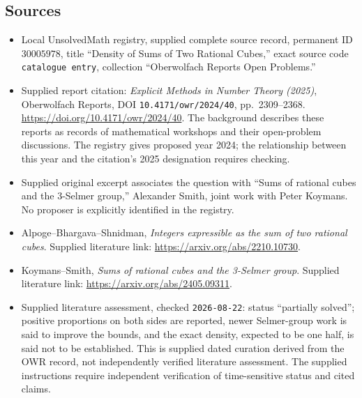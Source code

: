 \documentclass[11pt]{article}
\begin{document}
\subsection{Sources}
\begin{itemize}
\item Local UnsolvedMath registry, supplied complete source record, permanent ID \(30005978\), title ``Density of Sums of Two Rational Cubes,'' exact source code \texttt{catalogue entry}, collection ``Oberwolfach Reports Open Problems.''
\item Supplied report citation: \emph{Explicit Methods in Number Theory (2025)}, Oberwolfach Reports, DOI \texttt{10.4171/owr/2024/40}, pp.\ 2309--2368. \url{https://doi.org/10.4171/owr/2024/40}. The background describes these reports as records of mathematical workshops and their open-problem discussions. The registry gives proposed year 2024; the relationship between this year and the citation's 2025 designation requires checking.
\item Supplied original excerpt associates the question with ``Sums of rational cubes and the 3-Selmer group,'' Alexander Smith, joint work with Peter Koymans. No proposer is explicitly identified in the registry.
\item Alpoge--Bhargava--Shnidman, \emph{Integers expressible as the sum of two rational cubes}. Supplied literature link: \url{https://arxiv.org/abs/2210.10730}.
\item Koymans--Smith, \emph{Sums of rational cubes and the 3-Selmer group}. Supplied literature link: \url{https://arxiv.org/abs/2405.09311}.
\item Supplied literature assessment, checked \texttt{2026-08-22}: status ``partially solved''; positive proportions on both sides are reported, newer Selmer-group work is said to improve the bounds, and the exact density, expected to be one half, is said not to be established. This is supplied dated curation derived from the OWR record, not independently verified literature assessment. The supplied instructions require independent verification of time-sensitive status and cited claims.
\end{itemize}
\end{document}
